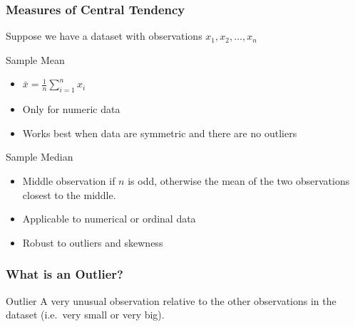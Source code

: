 \documentclass[handout]{beamer}
\begin{document}
\begin{frame}
\frametitle{Measures of Central Tendency}
Suppose we have a dataset with observations $x_1, x_2, \hdots, x_n$
	\begin{block}{Sample Mean}
		\begin{itemize}
			\item $\displaystyle\bar{x} = \frac{1}{n} \sum_{i=1}^n x_i$
			\item Only for numeric data
			\item Works best when data are symmetric and there are no outliers
		\end{itemize}
	\end{block}\pause
	\begin{block}{Sample Median}
		\begin{itemize}
		\item Middle observation if $n$ is odd, otherwise the mean of the two observations closest to the middle.
		\item Applicable to numerical or ordinal data
		\item Robust to outliers and skewness
		\end{itemize}
	\end{block}
\end{frame}

\begin{frame}
\frametitle{What is an Outlier?}
	\begin{block}{Outlier}
	A very unusual observation relative to the other observations in the dataset (i.e.\ very small or very big).
\end{block}
\end{frame}
\end{document}
